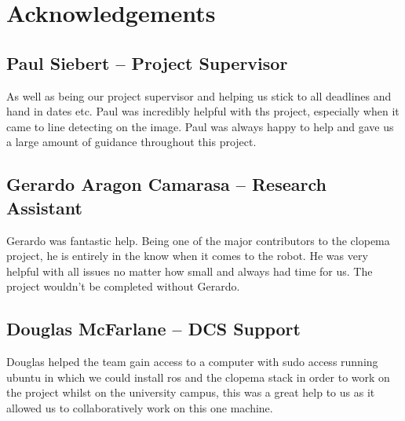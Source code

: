 \documentclass{l3proj}
\begin{document}
\clearpage
\chapter*{Acknowledgements}
\section*{Paul Siebert -- Project Supervisor}
As well as being our project supervisor and helping us stick to all deadlines and hand in dates etc. Paul was incredibly helpful with ths project, especially when it came to line detecting on the image. Paul was always happy to help and gave us a large amount of guidance throughout this project.
\section*{Gerardo Aragon Camarasa -- Research Assistant}
Gerardo was fantastic help. Being one of the major contributors to the \acrshort{clopema} project, he is entirely in the know when it comes to the robot. He was very helpful with all issues no matter how small and always had time for us. The project wouldn't be completed without Gerardo.
\section*{Douglas McFarlane -- DCS Support}
Douglas helped the team gain access to a computer with sudo access running \gls{ubuntu} in which we could install \acrshort{ros} and the \acrshort{clopema} stack in order to work on the project whilst on the university campus, this was a great help to us as it allowed us to collaboratively work on this one machine.
\end{document}
